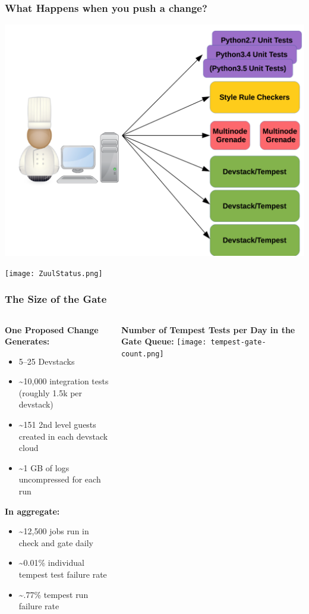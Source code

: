 \documentclass[aspectratio=169,11pt,hyperref={colorlinks=true}]{beamer}
\begin{document}
\begin{frame}
\frametitle{What Happens when you push a change?}
\begin{center}
	\includegraphics[width=.7\textwidth]{jobs.png}
\end{center}
\end{frame}

\begin{frame}
\begin{center}
    \texttt{[image: ZuulStatus.png]}
\end{center}
\end{frame}

\begin{frame}
\frametitle{The Size of the Gate}
    \begin{columns}[T]
        \begin{column}{.48\textwidth}
            \textbf{One Proposed Change Generates:}
			\begin{itemize}
				\item 5--25 Devstacks
				\item \textasciitilde10,000 integration tests (roughly 1.5k per devstack)
                \item \textasciitilde151 2nd level guests created in each devstack cloud
                \item \textasciitilde1 GB of logs uncompressed for each run
			\end{itemize}
            \textbf{In aggregate:}
            \begin{itemize}
                \item \textasciitilde12,500 jobs run in check and gate daily
                \item \textasciitilde0.01\% individual tempest test failure rate
                \item \textasciitilde.77\% tempest run failure rate
            \end{itemize}
        \end{column}
        \begin{column}{.48\textwidth}
            \centering
            \textbf{Number of Tempest Tests per Day in the Gate Queue:}
            \texttt{[image: tempest-gate-count.png]}
        \end{column}
    \end{columns}
\end{frame}
\end{document}
